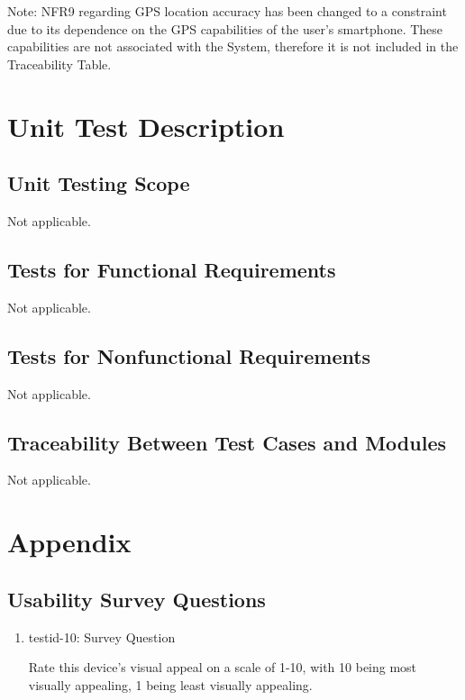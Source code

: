 \documentclass[12pt, titlepage]{article}
\begin{document}
Note: NFR9 regarding GPS location accuracy has been changed to a constraint due to its dependence on the GPS capabilities of the user's smartphone. These capabilities are not associated with the System, therefore it is not included in the Traceability Table.

\section{Unit Test Description}
\label{Section 6}

\subsection{Unit Testing Scope}

Not applicable.

\subsection{Tests for Functional Requirements}

Not applicable.

\subsection{Tests for Nonfunctional Requirements}

Not applicable.

\subsection{Traceability Between Test Cases and Modules}

Not applicable.
				




\newpage

\section{Appendix}

\subsection{Usability Survey Questions}

\begin{enumerate}

\item{testid-10: Survey Question}
\label{Survey}

Rate this device's visual appeal on a scale of 1-10, with 10 being most visually appealing, 1 being least visually appealing.

\end{enumerate}
\end{document}
